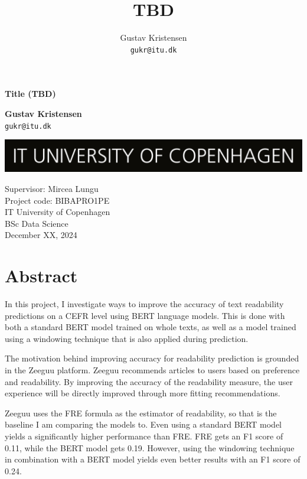 \documentclass[11pt,a4paper]{article}
\title{TBD}
\author{Gustav Kristensen \\ \texttt{gukr@itu.dk}}
\begin{document}
\begin{titlepage}
  \begin{center}
    \vspace*{1cm}

    \textbf{Title (TBD)}

    \vspace{1cm}

    \textbf{Gustav Kristensen} \\
    \texttt{gukr@itu.dk}

    \vfill

    \includegraphics[width=\textwidth]{figures/ITU_logo_UK jpg.jpg}

    \vfill

    Supervisor: Mircea Lungu \\
    Project code: BIBAPRO1PE \\
    IT University of Copenhagen \\
    BSc Data Science \\
    December XX, 2024
  \end{center}
\end{titlepage}

\section{Abstract}

In this project, I investigate ways to improve the accuracy of text readability
predictions on a CEFR level using BERT language models. This is done with both
a standard BERT model trained on whole texts, as well as a model trained using
a windowing technique that is also applied during prediction.

The motivation behind improving accuracy for readability prediction is grounded
in the Zeeguu platform. Zeeguu recommends articles to users based on preference
and readability. By improving the accuracy of the readability measure, the user
experience will be directly improved through more fitting recommendations.

Zeeguu uses the FRE formula as the estimator of readability, so that is the baseline I am
comparing the models to. Even using a standard BERT model yields a
significantly higher performance than FRE. FRE gets an F1 score of 0.11, while
the BERT model gets 0.19. However, using the windowing technique in combination
with a BERT model yields even better results with an F1 score of 0.24.
\end{document}
